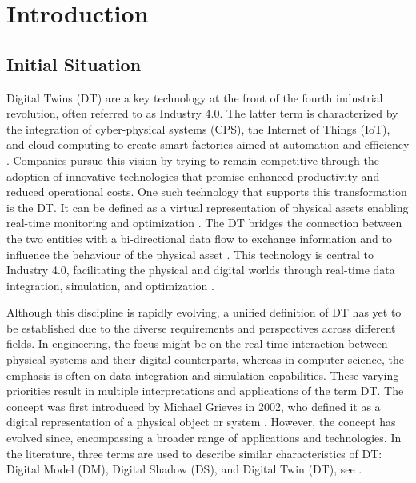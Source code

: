 \chapter{Introduction}
\label{chap:introduction}

\section{Initial Situation}
Digital Twins (DT) are a key technology at the front of the fourth industrial revolution, often referred to as Industry 4.0.
The latter term is characterized by the integration of cyber-physical systems (CPS), the Internet of Things (IoT), and cloud computing to create smart factories aimed at automation and efficiency \autocite{Oztemel2020}. Companies pursue this vision by trying to remain competitive through the adoption of innovative technologies that promise enhanced productivity and reduced operational costs. One such technology that supports this transformation is the DT. It can be defined as a virtual representation of physical assets enabling real-time monitoring and optimization \autocite{Tao2018ijamt}. The DT bridges the connection between the two entities with a bi-directional data flow to exchange information and to influence the behaviour of the physical asset \autocite{grieves2014digital}. This technology is central to Industry 4.0, facilitating the physical and digital worlds through real-time data integration, simulation, and optimization \autocite{judijanto2024trends}.

Although this discipline is rapidly evolving, a unified definition of DT has yet to be established due to the diverse requirements and perspectives across different fields. In engineering, the focus might be on the real-time interaction between physical systems and their digital counterparts, whereas in computer science, the emphasis is often on data integration and simulation capabilities. These varying priorities result in multiple interpretations and applications of the term DT. The concept was first introduced by Michael Grieves in 2002, who defined it as a digital representation of a physical object or system \autocite{grieves2014digital}. However, the concept has evolved since, encompassing a broader range of applications and technologies. In the literature, three terms are used to describe similar characteristics of DT: Digital Model (DM), Digital Shadow (DS), and Digital Twin (DT), see  \autocite{jones2020characterising,Zhang2021jmsy}.

